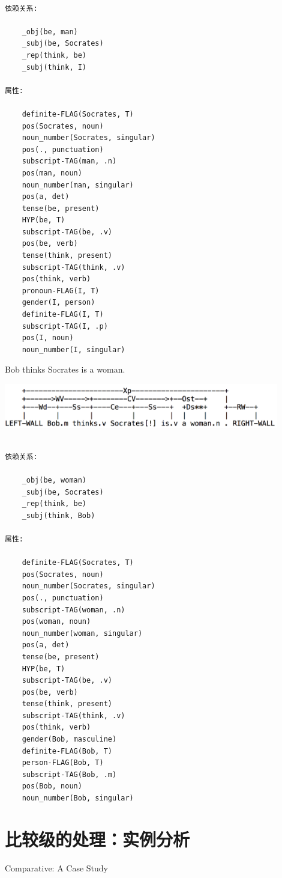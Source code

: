 \begin{verbatim}

依赖关系:

    _obj(be, man)
    _subj(be, Socrates)
    _rep(think, be)
    _subj(think, I)

属性:

    definite-FLAG(Socrates, T)
    pos(Socrates, noun)
    noun_number(Socrates, singular)
    pos(., punctuation)
    subscript-TAG(man, .n)
    pos(man, noun)
    noun_number(man, singular)
    pos(a, det)
    tense(be, present)
    HYP(be, T)
    subscript-TAG(be, .v)
    pos(be, verb)
    tense(think, present)
    subscript-TAG(think, .v)
    pos(think, verb)
    pronoun-FLAG(I, T)
    gender(I, person)
    definite-FLAG(I, T)
    subscript-TAG(I, .p)
    pos(I, noun)
    noun_number(I, singular)

\end{verbatim}

  Bob thinks Socrates is a woman.

\includegraphics[width=12cm]{figures/Socrates_5.png}

\begin{verbatim}

依赖关系:

    _obj(be, woman)
    _subj(be, Socrates)
    _rep(think, be)
    _subj(think, Bob)

属性:

    definite-FLAG(Socrates, T)
    pos(Socrates, noun)
    noun_number(Socrates, singular)
    pos(., punctuation)
    subscript-TAG(woman, .n)
    pos(woman, noun)
    noun_number(woman, singular)
    pos(a, det)
    tense(be, present)
    HYP(be, T)
    subscript-TAG(be, .v)
    pos(be, verb)
    tense(think, present)
    subscript-TAG(think, .v)
    pos(think, verb)
    gender(Bob, masculine)
    definite-FLAG(Bob, T)
    person-FLAG(Bob, T)
    subscript-TAG(Bob, .m)
    pos(Bob, noun)
    noun_number(Bob, singular)

\end{verbatim}

\section{比较级的处理：实例分析}{Comparative: A Case Study}  

